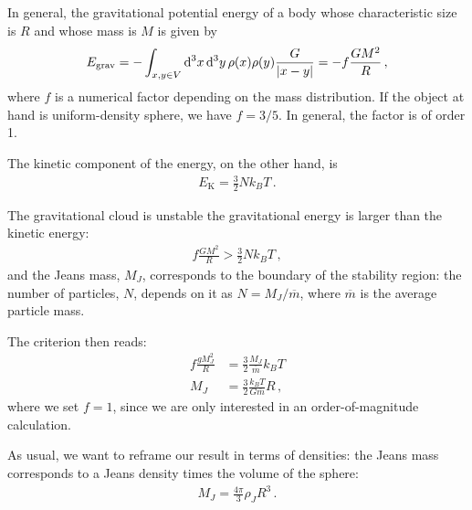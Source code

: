 \documentclass[main.tex]{subfiles}
\begin{document}
In general, the gravitational potential energy of a body whose characteristic size is \(R\) and whose mass is \(M\) is given by
%
\begin{align}
  E _{\text{grav}} 
  = - \int_{x, y \in V} \dd[3]{x} \dd[3]{y} \rho (x) \rho (y) \frac{G}{\abs{x - y}}  
  = - f \frac{GM^2}{R}
\,,
\end{align}
%
where \(f\) is a numerical factor depending on the mass distribution. 
If the object at hand is uniform-density sphere, we have \(f = 3/5\).
In general, the factor is of order 1. 

The kinetic component of the energy, on the other hand, is 
%
\begin{align}
  E _{\text{K}} = \frac{3}{2} N k_B T
\,.
\end{align}


The gravitational cloud is unstable the gravitational energy is larger than the kinetic energy:
%
\begin{align}
  f \frac{GM^2}{R} > \frac{3}{2} N k_B T 
\,,
\end{align}
%
and the Jeans mass, \(M_J\), corresponds to the boundary of the stability region: the number of particles, \(N\), depends on it as \(N = M_J / \overline{m}\), where \(\overline{m}\) is the average particle mass.

The criterion then reads:
%
\begin{align}
  f \frac{gM_J^2}{R} &= \frac{3}{2} \frac{M_J}{\bar{m}} k_B T \\
  M_J &= \frac{3}{2} \frac{k_B T }{G \bar{m}} R
\,,
\end{align}
%
where we set \(f =1\), since we are only interested in an order-of-magnitude calculation.
%

As usual, we want to reframe our result in terms of densities: the Jeans mass corresponds to a Jeans density times the volume of the sphere:
%
\begin{align}
  M_J = \frac{4 \pi }{3} \rho _J R^3
\,.
\end{align}
\end{document}

